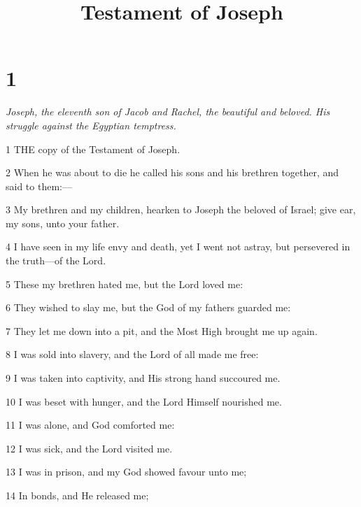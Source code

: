 

\title{Testament of Joseph}

\chapter{1}

\par \textit{Joseph, the eleventh son of Jacob and Rachel, the beautiful and beloved. His struggle against the Egyptian temptress.}

\par 1 THE copy of the Testament of Joseph.

\par 2 When he was about to die he called his sons and his brethren together, and said to them:—

\par 3 My brethren and my children, hearken to Joseph the beloved of Israel; give ear, my sons, unto your father.

\par 4 I have seen in my life envy and death, yet I went not astray, but persevered in the truth—of the Lord.

\par 5 These my brethren hated me, but the Lord loved me:

\par 6 They wished to slay me, but the God of my fathers guarded me:

\par 7 They let me down into a pit, and the Most High brought me up again.

\par 8 I was sold into slavery, and the Lord of all made me free:

\par 9 I was taken into captivity, and His strong hand succoured me.

\par 10 I was beset with hunger, and the Lord Himself nourished me.

\par 11 I was alone, and God comforted me:

\par 12 I was sick, and the Lord visited me.

\par 13 I was in prison, and my God showed favour unto me;

\par 14 In bonds, and He released me;

